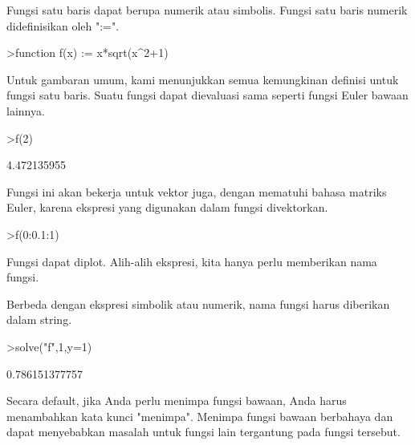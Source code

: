 \documentclass[a4paper,10pt]{article}
\begin{document}
\begin{eulernotebook}
\begin{eulercomment}
\begin{eulercomment}
\begin{eulercomment}
\begin{eulercomment}
\begin{eulercomment}
Fungsi satu baris dapat berupa numerik atau simbolis. Fungsi satu
baris numerik didefinisikan oleh ":=".
\end{eulercomment}
\begin{eulerprompt}
>function f(x) := x*sqrt(x^2+1)
\end{eulerprompt}
\begin{eulercomment}
Untuk gambaran umum, kami menunjukkan semua kemungkinan definisi untuk
fungsi satu baris. Suatu fungsi dapat dievaluasi sama seperti fungsi
Euler bawaan lainnya.
\end{eulercomment}
\begin{eulerprompt}
>f(2)
\end{eulerprompt}
\begin{euleroutput}
  4.472135955
\end{euleroutput}
\begin{eulercomment}
Fungsi ini akan bekerja untuk vektor juga, dengan mematuhi bahasa
matriks Euler, karena ekspresi yang digunakan dalam fungsi
divektorkan.
\end{eulercomment}
\begin{eulerprompt}
>f(0:0.1:1)
\end{eulerprompt}
\begin{euleroutput}
  [0,  0.100499,  0.203961,  0.313209,  0.430813,  0.559017,  0.699714,
  0.854459,  1.0245,  1.21083,  1.41421]
\end{euleroutput}
\begin{eulercomment}
Fungsi dapat diplot. Alih-alih ekspresi, kita hanya perlu memberikan
nama fungsi.

Berbeda dengan ekspresi simbolik atau numerik, nama fungsi harus
diberikan dalam string.
\end{eulercomment}
\begin{eulerprompt}
>solve("f",1,y=1)
\end{eulerprompt}
\begin{euleroutput}
  0.786151377757
\end{euleroutput}
\begin{eulercomment}
Secara default, jika Anda perlu menimpa fungsi bawaan, Anda harus
menambahkan kata kunci "menimpa". Menimpa fungsi bawaan berbahaya dan
dapat menyebabkan masalah untuk fungsi lain tergantung pada fungsi
tersebut.


\end{eulercomment}
\end{eulercomment}
\end{eulercomment}
\end{eulercomment}
\end{eulercomment}
\end{eulernotebook}
\end{document}
